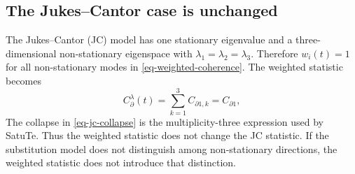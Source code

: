 \subsection*{The Jukes--Cantor case is unchanged}

The Jukes--Cantor (JC) model has one stationary eigenvalue and a three-dimensional non-stationary eigenspace with \(\lambda_1=\lambda_2=\lambda_3\). Therefore \(w_i(t)=1\) for all non-stationary modes in \cref{eq-weighted-coherence}. The weighted statistic becomes
\begin{equation}
C_{\partial}^{\lambda}(t)
=
\sum_{k=1}^{3} C_{\partial 1,k}
=
C_{\partial 1},
\label{eq-jc-collapse}
\end{equation}
The collapse in \cref{eq-jc-collapse} is the multiplicity-three expression used by SatuTe. Thus the weighted statistic does not change the JC statistic. If the substitution model does not distinguish among non-stationary directions, the weighted statistic does not introduce that distinction.
